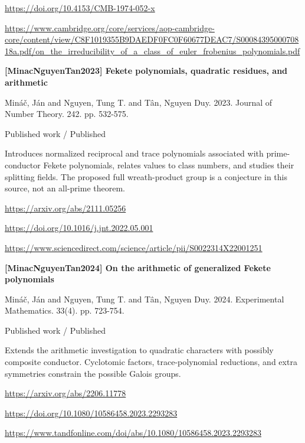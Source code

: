 \documentclass[11pt,a4paper,oneside,openany]{book}
\begin{document}
{\footnotesize\url{https://doi.org/10.4153/CMB-1974-052-x}}\par
{\footnotesize\url{https://www.cambridge.org/core/services/aop-cambridge-core/content/view/C8F1019355B9DAEDF0FC0F60677DEAC7/S0008439500070818a.pdf/on_the_irreducibility_of_a_class_of_euler_frobenius_polynomials.pdf}}\par
\vspace{9pt}
\hypertarget{ref:MinacNguyenTan2023}{}
{\sffamily\bfseries\color{atlasgreen}[MinacNguyenTan2023] Fekete polynomials, quadratic residues, and arithmetic}\par
\color{black} Mináč, Ján and Nguyen, Tung T. and Tân, Nguyen Duy. 2023. Journal of Number Theory. 242. pp. 532-575.\par
{\small\sffamily\color{atlasgold}Published work / Published}\par
\color{black} Introduces normalized reciprocal and trace polynomials associated with prime-conductor Fekete polynomials, relates values to class numbers, and studies their splitting fields. The proposed full wreath-product group is a conjecture in this source, not an all-prime theorem.\par
{\footnotesize\url{https://arxiv.org/abs/2111.05256}}\par
{\footnotesize\url{https://doi.org/10.1016/j.jnt.2022.05.001}}\par
{\footnotesize\url{https://www.sciencedirect.com/science/article/pii/S0022314X22001251}}\par
\vspace{9pt}
\hypertarget{ref:MinacNguyenTan2024}{}
{\sffamily\bfseries\color{atlasgreen}[MinacNguyenTan2024] On the arithmetic of generalized Fekete polynomials}\par
\color{black} Mináč, Ján and Nguyen, Tung T. and Tân, Nguyen Duy. 2024. Experimental Mathematics. 33(4). pp. 723-754.\par
{\small\sffamily\color{atlasgold}Published work / Published}\par
\color{black} Extends the arithmetic investigation to quadratic characters with possibly composite conductor. Cyclotomic factors, trace-polynomial reductions, and extra symmetries constrain the possible Galois groups.\par
{\footnotesize\url{https://arxiv.org/abs/2206.11778}}\par
{\footnotesize\url{https://doi.org/10.1080/10586458.2023.2293283}}\par
{\footnotesize\url{https://www.tandfonline.com/doi/abs/10.1080/10586458.2023.2293283}}\par
\end{document}
